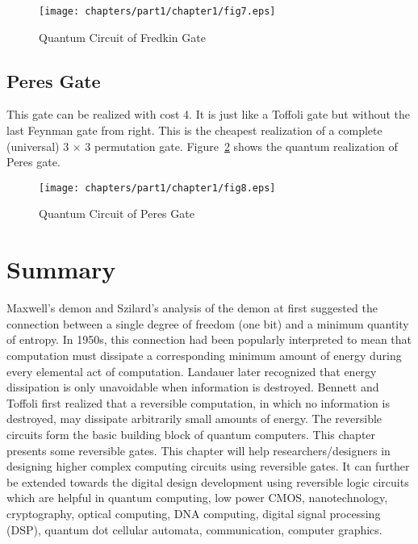 	\begin{figure}[h]
	\centering
	\texttt{[image: chapters/part1/chapter1/fig7.eps]}
	\caption{Quantum Circuit of Fredkin Gate}
	\label{fig:p1_c1_fig7}
\end{figure}

\subsection{Peres Gate}
	This gate can be realized with cost 4. It is just like a Toffoli gate but without the last Feynman gate from right. This is the cheapest realization of a complete (universal) 3 $\times$ 3 permutation gate. Figure~\ref{fig:p1_c1_fig8} shows the quantum realization of Peres gate.
	\\
	\begin{figure}[h]
		\centering
		\texttt{[image: chapters/part1/chapter1/fig8.eps]}
		\caption{Quantum Circuit of Peres Gate}
		\label{fig:p1_c1_fig8}
	\end{figure}

\section{Summary}
Maxwell's demon and Szilard's analysis of the demon at first suggested the connection between a single degree of freedom (one bit) and a minimum quantity of entropy. In 1950s, this connection had been popularly interpreted to mean that computation must dissipate a corresponding minimum amount of energy during every elemental act of computation. Landauer later recognized that energy dissipation is only unavoidable when information is destroyed. Bennett and Toffoli first realized that a reversible computation, in which no information is destroyed, may dissipate arbitrarily small amounts of energy. The reversible circuits form the basic building block of quantum computers. This chapter presents some reversible gates. This chapter will help researchers/designers in designing higher complex computing circuits using reversible gates. It can further be extended towards the digital design  development using reversible logic circuits which are helpful in quantum computing, low power CMOS, nanotechnology, cryptography, optical computing, DNA computing, digital signal processing (DSP), quantum dot cellular automata, communication, computer graphics.
